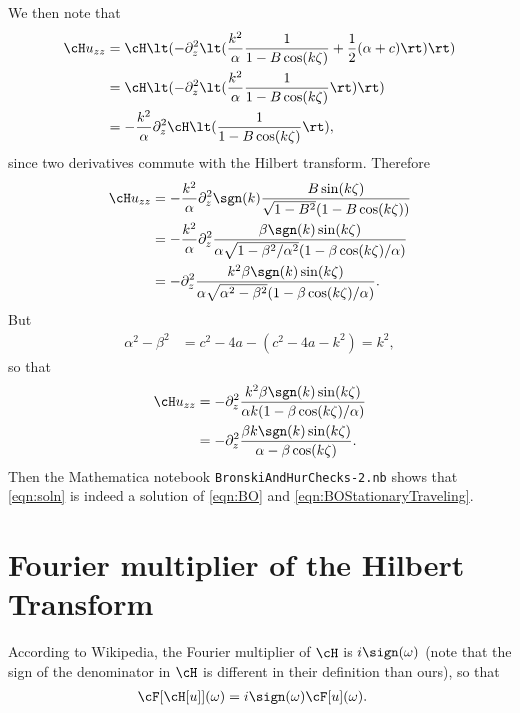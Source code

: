 \documentclass[a4paper,10pt]{article}
\begin{document}
We then note that
\begin{align}
  \cH u_{zz} &= \cH\lt( -\partial_z^2 \lt(\frac{k^2}{\alpha}
  \frac{1}{1-B\cos(k\zeta)} + \frac12(\alpha +c)\rt)\rt)\\
  &= \cH\lt(- \partial_z^2 \lt(\frac{k^2}{\alpha}
  \frac{1}{1-B\cos(k\zeta)}\rt) \rt)\\
  &=-\frac{k^2}{\alpha} \partial_z^2 \cH\lt( 
  \frac{1}{1-B\cos(k\zeta)}\rt),
\end{align}
since two derivatives commute with the Hilbert transform. Therefore
\begin{align}
  \cH u_{zz} &= -\frac{k^2}{\alpha}\partial_z^2 \sgn(k) \frac{B
  \sin(k\zeta)}{\sqrt{1-B^2}(1-B \cos(k\zeta))}\\
  &= -\frac{k^2}{\alpha} \partial_z^2 \frac{ \beta \sgn(k)\sin(k\zeta)}{\alpha
  \sqrt{1-\beta^2/\alpha^2}(1-\beta \cos(k\zeta)/\alpha)}\\
  &= -\partial_z^2 \frac{k^2 \beta \sgn(k)\sin(k\zeta)}{\alpha\sqrt{\alpha^2-\beta^2}(1-\beta
  \cos(k\zeta)/\alpha)}.
\end{align}
But 
\begin{align}
  \alpha^2 -\beta^2 &= c^2 -4a - (c^2-4a-k^2) = k^2,
\end{align}
so that
\begin{align}
    \cH u_{zz} &= -\partial_z^2 \frac{k^2 \beta \sgn(k)\sin(k\zeta)}{\alpha
    k(1-\beta \cos(k\zeta)/\alpha)}\\
    &= -\partial_z^2 \frac{\beta k \sgn(k)\sin(k\zeta)}{\alpha - \beta \cos(k\zeta)}.
\end{align}
Then the Mathematica notebook \verb+BronskiAndHurChecks-2.nb+ shows that
\eqref{eqn:soln} is indeed a solution of \eqref{eqn:BO} and
\eqref{eqn:BOStationaryTraveling}.


\section{Fourier multiplier of the Hilbert Transform}
According to Wikipedia, the Fourier multiplier of $\cH$ is $i\sign(\omega)$
(note that the sign of the denominator in $\cH$ is different in their definition
than ours), so that
\begin{align}
  \cF[ \cH[u]](\omega) &= i\sign(\omega) \cF[u](\omega).
\end{align}


{\footnotesize

}
\end{document}

